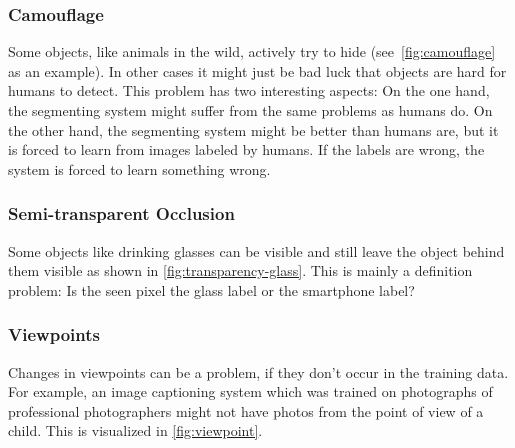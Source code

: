\subsubsection{Camouflage}
Some objects, like animals in the wild, actively try to hide
(see~\cref{fig:camouflage} as an example). In other cases it might just be bad
luck that objects are hard for humans to detect. This problem has two
interesting aspects: On the one hand, the segmenting system might suffer from
the same problems as humans do. On the other hand, the segmenting system might
be better than humans are, but it is forced to learn from images labeled by
humans. If the labels are wrong, the system is forced to learn something wrong.

\subsubsection{Semi-transparent Occlusion}
Some objects like drinking glasses can be visible and still leave the object
behind them visible as shown in \cref{fig:transparency-glass}. This is mainly a
definition problem: Is the seen pixel the glass label or the smartphone label?

\subsubsection{Viewpoints}
Changes in viewpoints can be a problem, if they don't occur in the training
data. For example, an image captioning system which was trained on photographs
of professional photographers might not have photos from the point of view of
a child. This is visualized in \cref{fig:viewpoint}.
